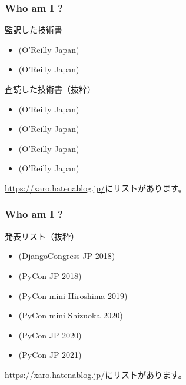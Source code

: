 \documentclass[aspectratio=169,dvipdfmx,14pt,notheorems]{beamer}
\theoremstyle{definition}
\begin{document}
\begin{frame}\frametitle{Who am I ?}

\begin{block}{監訳した技術書}
\begin{itemize}
\item {}(O'Reilly Japan)
\item {}(O'Reilly Japan)
\end{itemize}
\end{block}

\begin{block}{査読した技術書（抜粋）}
\begin{itemize}
\item {}(O'Reilly Japan)
\item {}(O'Reilly Japan)
\item {}(O'Reilly Japan)
\item {}(O'Reilly Japan)
\end{itemize}
\end{block}
\url{https://xaro.hatenablog.jp/}にリストがあります。
\end{frame}

\begin{frame}\frametitle{Who am I ?}

\begin{block}{発表リスト（抜粋）}
\begin{itemize}
\item {}(DjangoCongress JP 2018)
\item {}(PyCon JP 2018)
\item {}(PyCon mini Hiroshima 2019)
\item {}(PyCon mini Shizuoka 2020)
\item {}(PyCon JP 2020)
\item {}(PyCon JP 2021)
\end{itemize}
\end{block}
\url{https://xaro.hatenablog.jp/}にリストがあります。
\end{frame}
\end{document}
